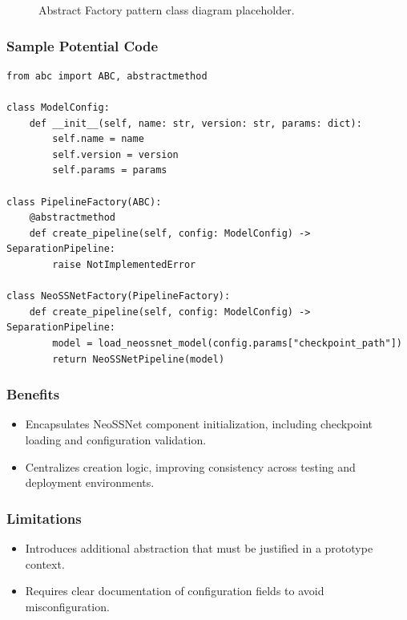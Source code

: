 \documentclass[12pt,a4paper]{report}
\begin{document}
\begin{figure}[h]
  \centering
  \caption{Abstract Factory pattern class diagram placeholder.}
\end{figure}

\subsubsection*{Sample Potential Code}
\begin{lstlisting}[style=pystyle,caption={Abstract Factory for NeoSSNet pipeline creation.}]
from abc import ABC, abstractmethod

class ModelConfig:
    def __init__(self, name: str, version: str, params: dict):
        self.name = name
        self.version = version
        self.params = params

class PipelineFactory(ABC):
    @abstractmethod
    def create_pipeline(self, config: ModelConfig) -> SeparationPipeline:
        raise NotImplementedError

class NeoSSNetFactory(PipelineFactory):
    def create_pipeline(self, config: ModelConfig) -> SeparationPipeline:
        model = load_neossnet_model(config.params["checkpoint_path"])
        return NeoSSNetPipeline(model)
\end{lstlisting}

\subsubsection*{Benefits}
\begin{itemize}[nosep]
  \item Encapsulates NeoSSNet component initialization, including checkpoint loading and configuration validation.
  \item Centralizes creation logic, improving consistency across testing and deployment environments.
\end{itemize}

\subsubsection*{Limitations}
\begin{itemize}[nosep]
  \item Introduces additional abstraction that must be justified in a prototype context.
  \item Requires clear documentation of configuration fields to avoid misconfiguration.
\end{itemize}
\end{document}

